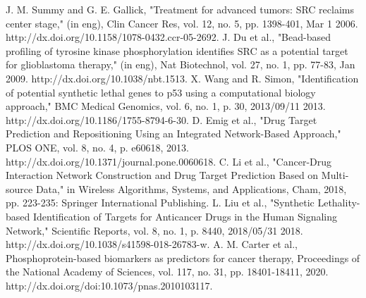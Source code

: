 \documentclass[5p,,preprint,12pt]{elsarticle}
\begin{document}
\begin{thebibliography}{71}
	J. M. Summy and G. E. Gallick, "Treatment for advanced tumors: SRC reclaims center stage," (in eng), Clin Cancer Res, vol. 12, no. 5, pp. 1398-401, Mar 1 2006. http://dx.doi.org/10.1158/1078-0432.ccr-05-2692.
	J. Du et al., "Bead-based profiling of tyrosine kinase phosphorylation identifies SRC as a potential target for glioblastoma therapy," (in eng), Nat Biotechnol, vol. 27, no. 1, pp. 77-83, Jan 2009. http://dx.doi.org/10.1038/nbt.1513.
	X. Wang and R. Simon, "Identification of potential synthetic lethal genes to p53 using a computational biology approach," BMC Medical Genomics, vol. 6, no. 1, p. 30, 2013/09/11 2013. http://dx.doi.org/10.1186/1755-8794-6-30.
	D. Emig et al., "Drug Target Prediction and Repositioning Using an Integrated Network-Based Approach," PLOS ONE, vol. 8, no. 4, p. e60618, 2013. http://dx.doi.org/10.1371/journal.pone.0060618.
	C. Li et al., "Cancer-Drug Interaction Network Construction and Drug Target Prediction Based on Multi-source Data," in Wireless Algorithms, Systems, and Applications, Cham, 2018, pp. 223-235: Springer International Publishing.
	L. Liu et al., "Synthetic Lethality-based Identification of Targets for Anticancer Drugs in the Human Signaling Network," Scientific Reports, vol. 8, no. 1, p. 8440, 2018/05/31 2018. http://dx.doi.org/10.1038/s41598-018-26783-w.
	A. M. Carter et al., Phosphoprotein-based biomarkers as predictors for cancer therapy, Proceedings of the National Academy of Sciences, vol. 117, no. 31, pp. 18401-18411, 2020. http://dx.doi.org/doi:10.1073/pnas.2010103117.
\end{thebibliography}
\end{document}
